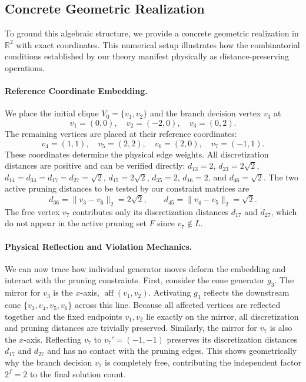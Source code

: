 \documentclass[11pt]{article}
\theoremstyle{plain}
\theoremstyle{definition}
\begin{document}
\subsection{Concrete Geometric Realization}
\label{sec:example-geometry}

To ground this algebraic structure, we provide a concrete geometric realization in $\mathbb{R}^2$ with exact coordinates. This numerical setup illustrates how the combinatorial conditions established by our theory manifest physically as distance-preserving operations.

\paragraph{Reference Coordinate Embedding.}
We place the initial clique $V_0 = \{v_1, v_2\}$ and the branch decision vertex $v_3$ at
\[
v_1 = (0,0), \quad v_2 = (-2,0), \quad v_3 = (0,2).
\]
The remaining vertices are placed at their reference coordinates:
\[
v_4 = (1, 1), \quad v_5 = (2, 2), \quad v_6 = (2, 0), \quad v_7 = (-1,1).
\]
These coordinates determine the physical edge weights. All discretization distances are positive and can be verified directly: $d_{13} = 2$, $d_{23} = 2\sqrt{2}$, $d_{14} = d_{34} = d_{17} = d_{27} = \sqrt{2}$, $d_{15} = 2\sqrt{2}$, $d_{35} = 2$, $d_{16} = 2$, and $d_{46} = \sqrt{2}$. The two active pruning distances to be tested by our constraint matrices are
\[
d_{36} = \|v_3 - v_6\|_2 = 2\sqrt{2},
\qquad
d_{45} = \|v_4 - v_5\|_2 = \sqrt{2}.
\]
The free vertex $v_7$ contributes only its discretization distances $d_{17}$ and $d_{27}$, which do not appear in the active pruning set $F$ since $v_7 \notin L$.

\paragraph{Physical Reflection and Violation Mechanics.}
We can now trace how individual generator moves deform the embedding and interact with the pruning constraints. First, consider the cone generator $g_3$. The mirror for $v_3$ is the $x$-axis, $\operatorname{aff}(v_1, v_2)$. Activating $g_3$ reflects the downstream cone $\{v_3, v_4, v_5, v_6\}$ across this line. Because all affected vertices are reflected together and the fixed endpoints $v_1,v_2$ lie exactly on the mirror, all discretization and pruning distances are trivially preserved. Similarly, the mirror for $v_7$ is also the $x$-axis. Reflecting $v_7$ to $v_7' = (-1,-1)$ preserves its discretization distances $d_{17}$ and $d_{27}$ and has no contact with the pruning edges. This shows geometrically why the branch decision $v_7$ is completely free, contributing the independent factor $2^f = 2$ to the final solution count.
\end{document}
